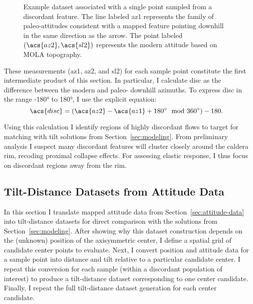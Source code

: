 \begin{figure}
    {\caption[Sample point attitude dataset]{
        Example dataset associated with a single point sampled from a discordant feature. The line labeled \acs{az1} represents the family of paleo-attitudes consistent with a mapped feature pointing downhill in the same direction as the arrow. The point labeled $(\acs{az2},\acs{sl2})$ represents the modern attitude based on \ac{MOLA} topography.
    }\label{fig:attitude-data}}
    {}
\end{figure}

These measurements (\acf{az1}, \acf{az2}, and \acf{sl2}) for each sample point constitute the first intermediate product of this section. In particular, I calculate \acl{disc} as the difference between the modern and paleo- downhill azimuths. To express \ac{disc} in the range \ang{-180} to \ang{180}, I use the explicit equation:
\begin{equation}
    \acs{disc} = (\acs{az2} - \acs{az1} + \ang{180} \mod \ang{360}) - 180.
\end{equation}

Using this calculation I identify regions of highly discordant flows to target for matching with tilt solutions from Section~\ref{sec:modeling}. From preliminary analysis I suspect many discordant features will cluster closely around the caldera rim, recoding proximal collapse effects. %
For assessing elastic response, I thus focus on discordant regions away from the rim.

\subsection{Tilt-Distance Datasets from Attitude Data}\label{sec:tilt-from-map}

In this section I translate mapped attitude data from Section~\ref{sec:attitude-data} into tilt-distance datasets for direct comparison with the solutions from Section~\ref{sec:modeling}. After showing why this dataset construction depends on the (unknown) position of the axisymmetric center, I define a spatial grid of candidate center points to evaluate. Next, I convert position and attitude data for a sample point into distance and tilt relative to a particular candidate center. I repeat this conversion for each sample (within a discordant population of interest) to produce a tilt-distance dataset corresponding to one center candidate. Finally, I repeat the full tilt-distance dataset generation for each center candidate.

